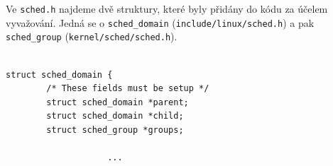 \documentclass[
  master=true,
  font=sans,
  printversion=false,
  joinlists=true,
  figures=true,
  tables=true,
  sourcecodes=false,
  theorems=false,
  bibencoding=utf8,
  language=czech,
  encoding=utf8,
  field=ainfk,
  biblatex,
  glossaries,
  index
]{kidiplom}
\begin{document}
Ve \verb#sched.h# najdeme dvě struktury, které byly přidány do kódu za účelem vyvažování. Jedná se o \verb#sched_domain# (\verb#include/linux/sched.h#) a pak \verb#sched_group# (\verb#kernel/sched/sched.h#).

\begin{verbatim} 

struct sched_domain {
        /* These fields must be setup */
        struct sched_domain *parent;
        struct sched_domain *child;
        struct sched_group *groups;

                	...

\end{verbatim} 


%
%
%
%
%
%
%
%
\end{document}
